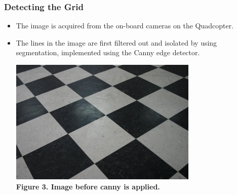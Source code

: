 \documentclass[12pt]{article}
\begin{document}
\subsubsection{Detecting the Grid}
\begin{itemize}
  \item The image is acquired from the on-board cameras on the Quadcopter.
  \item The lines in the image are first filtered out and isolated by using segmentation, implemented using the Canny edge detector. 
    \begin{center}\includegraphics{image25} \\
    \textbf{Figure 3. Image before canny is applied.}\end{center}
    

\end{itemize}
\end{document}
